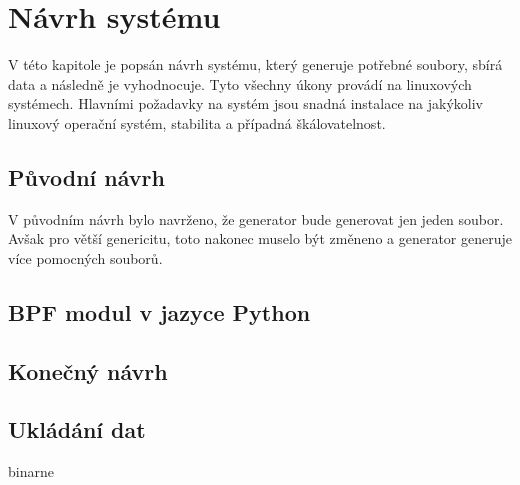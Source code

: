 \chapter{Návrh systému}
\label{sec:NavrhSystemu}

V této kapitole je popsán návrh systému, který generuje potřebné soubory, sbírá data a následně je vyhodnocuje.
Tyto všechny úkony provádí na linuxových systémech.
Hlavními požadavky na systém jsou snadná instalace na jakýkoliv linuxový operační systém, stabilita a případná škálovatelnost.


\section{Původní návrh}

V původním návrh bylo navrženo, že generator bude generovat jen jeden soubor. Avšak pro větší genericitu, toto nakonec
muselo být změneno a generator generuje více pomocných souborů.

\section{BPF modul v jazyce Python}

\section{Konečný návrh}

\section{Ukládání dat}
binarne

\iffalse
pragma pack
obrazek navrhu z prezentace
nasledna uprava obrazku
\fi